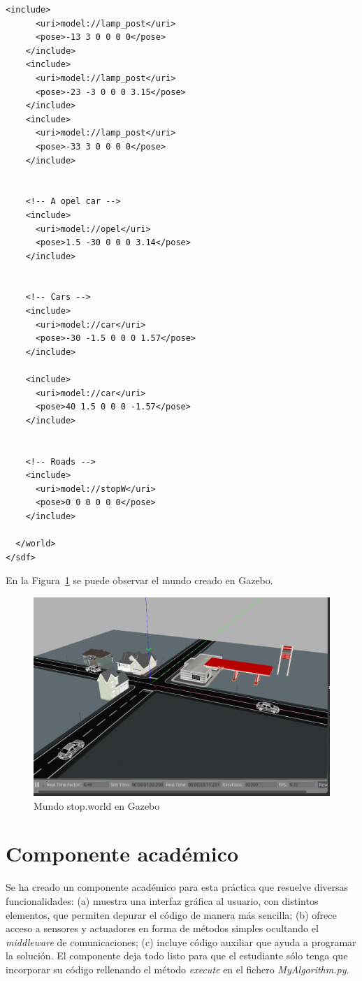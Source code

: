 \begin{lstlisting}[frame=single]
    <include>
      <uri>model://lamp_post</uri>
      <pose>-13 3 0 0 0 0</pose>
    </include>
    <include>
      <uri>model://lamp_post</uri>
      <pose>-23 -3 0 0 0 3.15</pose>
    </include>
    <include>
      <uri>model://lamp_post</uri>
      <pose>-33 3 0 0 0 0</pose>
    </include>
    

    <!-- A opel car -->
    <include>
      <uri>model://opel</uri>
      <pose>1.5 -30 0 0 0 3.14</pose> 
    </include>
    
    
    <!-- Cars -->
    <include>
      <uri>model://car</uri>
      <pose>-30 -1.5 0 0 0 1.57</pose>
    </include>
    
    <include>
      <uri>model://car</uri>
      <pose>40 1.5 0 0 0 -1.57</pose>
    </include>
    
    
    <!-- Roads -->
    <include>
      <uri>model://stopW</uri>
      <pose>0 0 0 0 0 0</pose>
    </include>
    
  </world>
</sdf>
	\end{lstlisting}


En la Figura~\ref{fig.stopWorld} se puede observar el mundo creado en Gazebo.

\begin{figure}[H]
  \begin{center}
    \includegraphics[width=1.0\textwidth]{figures/Stop/stopWorld.png}
		\caption{Mundo stop.world en Gazebo}
		\label{fig.stopWorld}
		\end{center}
\end{figure}


\section{Componente académico}
Se ha creado un componente académico para esta práctica que resuelve diversas funcionalidades: (a) muestra una interfaz gráfica al usuario, con distintos elementos, que permiten depurar el código de manera más sencilla; (b) ofrece acceso a sensores y actuadores en forma de métodos simples ocultando el \textit{middleware} de comunicaciones; (c) incluye código auxiliar que ayuda a programar la solución. El componente deja todo listo para que el estudiante sólo tenga que incorporar su código rellenando el método \textit{execute} en el fichero \textit{MyAlgorithm.py}.\\

